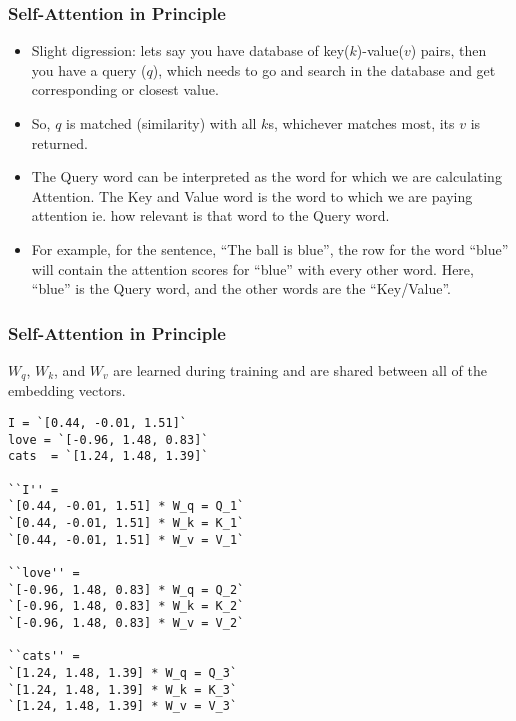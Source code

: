 \begin{frame}[fragile]\frametitle{Self-Attention in Principle}


\begin{itemize}
\item Slight digression: lets say you have database of key($k$)-value($v$) pairs, then you have a query ($q$), which needs to go and search in the database and get corresponding or closest value.
\item So, $q$ is matched (similarity) with all $k$s, whichever matches most, its $v$ is returned.
\item The Query word can be interpreted as the word for which we are calculating Attention. The Key and Value word is the word to which we are paying attention ie. how relevant is that word to the Query word.
\item For example, for the sentence, “The ball is blue”, the row for the word “blue” will contain the attention scores for “blue” with every other word. Here, “blue” is the Query word, and the other words are the “Key/Value”.
\end{itemize}

\end{frame}

\begin{frame}[fragile]\frametitle{Self-Attention in Principle}


$W_q$, $W_k$, and $W_v$ are learned during training and are shared between all of the embedding vectors.

\begin{lstlisting}
I = `[0.44, -0.01, 1.51]`
love = `[-0.96, 1.48, 0.83]`
cats  = `[1.24, 1.48, 1.39]`

``I'' = 
`[0.44, -0.01, 1.51] * W_q = Q_1` 
`[0.44, -0.01, 1.51] * W_k = K_1`
`[0.44, -0.01, 1.51] * W_v = V_1`

``love'' = 
`[-0.96, 1.48, 0.83] * W_q = Q_2`  
`[-0.96, 1.48, 0.83] * W_k = K_2`  
`[-0.96, 1.48, 0.83] * W_v = V_2`  

``cats'' = 
`[1.24, 1.48, 1.39] * W_q = Q_3`  
`[1.24, 1.48, 1.39] * W_k = K_3`  
`[1.24, 1.48, 1.39] * W_v = V_3` 
\end{lstlisting}
\end{frame}



